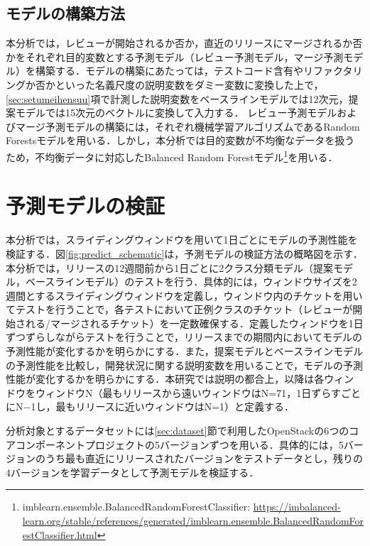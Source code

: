 \documentclass[11pt]{jreport}
\begin{document}
\subsection{モデルの構築方法}
本分析では，レビューが開始されるか否か，直近のリリースにマージされるか否かをそれぞれ目的変数とする予測モデル（レビュー予測モデル，マージ予測モデル）を構築する．モデルの構築にあたっては，テストコード含有やリファクタリングか否かといった名義尺度の説明変数をダミー変数に変換した上で，\ref{sec:setumeihensuu}項で計測した説明変数をベースラインモデルでは12次元，提案モデルでは15次元のベクトルに変換して入力する．
レビュー予測モデルおよびマージ予測モデルの構築には，それぞれ機械学習アルゴリズムであるRandom Forestsモデル\cite{randomforest}を用いる．しかし，本分析では目的変数が不均衡なデータを扱うため，不均衡データに対応したBalanced Random Forestモデル\footnote{imblearn.ensemble.BalancedRandomForestClassifier: \url{https://imbalanced-learn.org/stable/references/generated/imblearn.ensemble.BalancedRandomForestClassifier.html}}を用いる．

\section{予測モデルの検証}\label{sec:kenshou}
本分析では，スライディングウィンドウを用いて1日ごとにモデルの予測性能を検証する．図\ref{fig:predict_schematic}は，予測モデルの検証方法の概略図を示す．本分析では，リリースの12週間前から1日ごとに2クラス分類モデル（提案モデル，ベースラインモデル）のテストを行う．具体的には，ウィンドウサイズを2週間とするスライディングウィンドウを定義し，ウィンドウ内のチケットを用いてテストを行うことで，各テストにおいて正例クラスのチケット（レビューが開始される/マージされるチケット）を一定数確保する．定義したウィンドウを1日ずつずらしながらテストを行うことで，リリースまでの期間内においてモデルの予測性能が変化するかを明らかにする．また，提案モデルとベースラインモデルの予測性能を比較し，開発状況に関する説明変数を用いることで，モデルの予測性能が変化するかを明らかにする．本研究では説明の都合上，以降は各ウィンドウをウィンドウN（最もリリースから遠いウィンドウはN=71，1日ずらすごとにN$-$1し，最もリリースに近いウィンドウはN=1）と定義する．

分析対象とするデータセットには\ref{sec:dataset}節で利用したOpenStackの6つのコアコンポーネントプロジェクトの5バージョンずつを用いる．具体的には，5バージョンのうち最も直近にリリースされたバージョンをテストデータとし，残りの4バージョンを学習データとして予測モデルを検証する．
\end{document}
